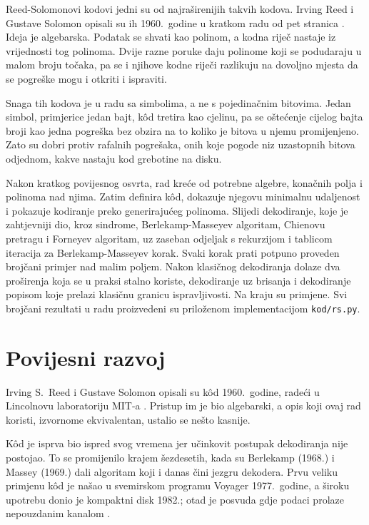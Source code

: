 \documentclass{mathos}
\begin{document}
Reed-Solomonovi kodovi jedni su od najraširenijih takvih kodova. Irving Reed i Gustave Solomon opisali su ih 1960.\ godine u kratkom radu od pet stranica \cite{reedsolomon}. Ideja je algebarska. Podatak se shvati kao polinom, a kodna riječ nastaje iz vrijednosti tog polinoma. Dvije razne poruke daju polinome koji se podudaraju u malom broju točaka, pa se i njihove kodne riječi razlikuju na dovoljno mjesta da se pogreške mogu i otkriti i ispraviti.

Snaga tih kodova je u radu sa simbolima, a ne s pojedinačnim bitovima. Jedan simbol, primjerice jedan bajt, kôd tretira kao cjelinu, pa se oštećenje cijelog bajta broji kao jedna pogreška bez obzira na to koliko je bitova u njemu promijenjeno. Zato su dobri protiv rafalnih pogrešaka, onih koje pogode niz uzastopnih bitova odjednom, kakve nastaju kod grebotine na disku.

Nakon kratkog povijesnog osvrta, rad kreće od potrebne algebre, konačnih polja i polinoma nad njima. Zatim definira kôd, dokazuje njegovu minimalnu udaljenost i pokazuje kodiranje preko generirajućeg polinoma. Slijedi dekodiranje, koje je zahtjevniji dio, kroz sindrome, Berlekamp-Masseyev algoritam, Chienovu pretragu i Forneyev algoritam, uz zaseban odjeljak s rekurzijom i tablicom iteracija za Berlekamp-Masseyev korak. Svaki korak prati potpuno proveden brojčani primjer nad malim poljem. Nakon klasičnog dekodiranja dolaze dva proširenja koja se u praksi stalno koriste, dekodiranje uz brisanja i dekodiranje popisom koje prelazi klasičnu granicu ispravljivosti. Na kraju su primjene. Svi brojčani rezultati u radu proizvedeni su priloženom implementacijom \verb|kod/rs.py|.


\chapter{Povijesni razvoj}\label{povijest}

\noindent
Irving S.\ Reed i Gustave Solomon opisali su kôd 1960.\ godine, radeći u Lincolnovu laboratoriju MIT-a \cite{reedsolomon}. Pristup im je bio algebarski, a opis koji ovaj rad koristi, izvornome ekvivalentan, ustalio se nešto kasnije.

Kôd je isprva bio ispred svog vremena jer učinkovit postupak dekodiranja nije postojao. To se promijenilo krajem šezdesetih, kada su Berlekamp (1968.) i Massey (1969.) dali algoritam koji i danas čini jezgru dekodera. Prvu veliku primjenu kôd je našao u svemirskom programu Voyager 1977.\ godine, a široku upotrebu donio je kompaktni disk 1982.; otad je posvuda gdje podaci prolaze nepouzdanim kanalom \cite{wicker}.
\end{document}
